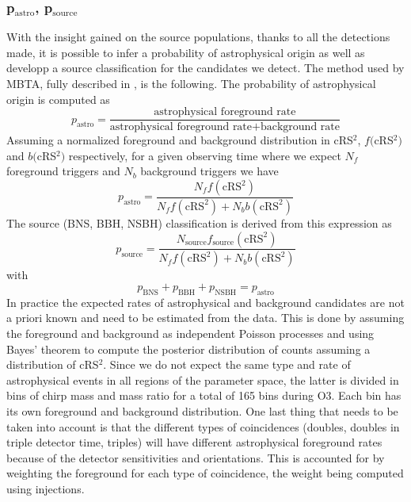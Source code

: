 \subsubsection{p$_{\textrm{astro}}$, p$_{\textrm{source}}$}
With the insight gained on the source populations, thanks to all the detections made, it is possible to infer a probability of astrophysical origin as well as developp a source classification for the candidates we detect.
The method used by MBTA, fully described in \cite{pastro}, is the following.
The probability of astrophysical origin is computed as
%
\begin{equation}
  p_{\textrm{astro}} = \frac{\textrm{astrophysical foreground rate}}{\textrm{astrophysical foreground rate} + \textrm{background rate}}
\end{equation}
%
Assuming a normalized foreground and background distribution in cRS$^2$, $f($cRS$^2)$ and $b($cRS$^2)$ respectively, for a given observing time where we expect $N_f$ foreground triggers and $N_b$ background triggers we have
%
\begin{equation}
  p_{\textrm{astro}} = \frac{N_f f(\textrm{cRS}^2)}{N_f f(\textrm{cRS}^2) + N_b b(\textrm{cRS}^2)}
\end{equation}
%
The source (BNS, BBH, NSBH) classification is derived from this expression as
%
\begin{equation}
  p_{\textrm{source}} = \frac{N_{\textrm{source}} f_{\textrm{source}}(\textrm{cRS}^2)}{N_f f(\textrm{cRS}^2) + N_b b(\textrm{cRS}^2)}
\end{equation}
%
with
%
\begin{equation}
  p_{\textrm{BNS}} + p_{\textrm{BBH}} + p_{\textrm{NSBH}} = p_{\textrm{astro}}
\end{equation}
%
In practice the expected rates of astrophysical and background candidates are not a priori known and need to be estimated from the data.
This is done by assuming the foreground and background as independent Poisson processes and using Bayes' theorem to compute the posterior distribution of counts assuming a distribution of cRS$^2$.
Since we do not expect the same type and rate of astrophysical events in all regions of the parameter space, the latter is divided in bins of chirp mass and mass ratio for a total of 165 bins during O3.
Each bin has its own foreground and background distribution.
One last thing that needs to be taken into account is that the different types of coincidences (doubles, doubles in triple detector time, triples) will have different astrophysical foreground rates because of the detector sensitivities and orientations.
This is accounted for by weighting the foreground for each type of coincidence, the weight being computed using injections.

